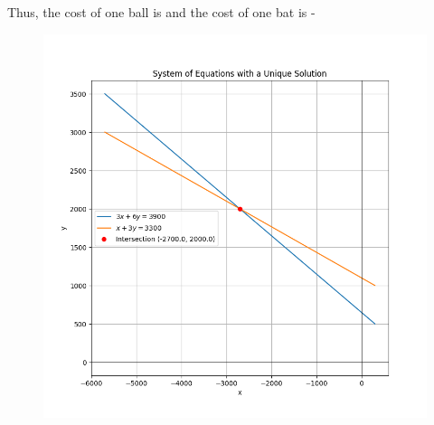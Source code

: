 \documentclass[journal]{IEEEtran}
\begin{document}
Thus, the cost of one ball is  and the cost of one bat is - 

\begin{figure}[h!]
    \centering
    \includegraphics[height=0.5\textheight, keepaspectratio]{figs/Figure_1.png}
    \label{figure_1}
\end{figure}
\end{document}
